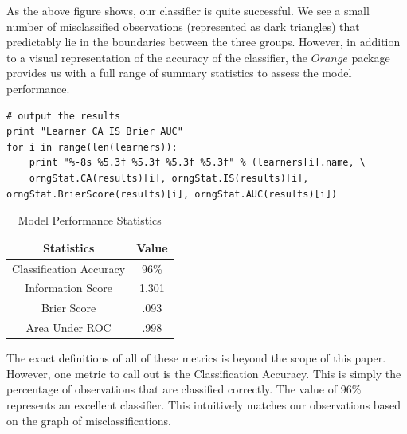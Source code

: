 \begin{flushleft}As the above figure shows, our classifier is quite successful. We see a small number of misclassified observations (represented as dark triangles) that predictably lie in the boundaries between the three groups. However, in addition to a visual representation of the accuracy of the classifier, the $Orange$ package provides us with a full range of summary statistics to assess the model performance. 
\end{flushleft}
\begin{lstlisting}[caption={Compute the Misclassified Observations},label=2nd,firstnumber=151]
# output the results
print "Learner CA IS Brier AUC"
for i in range(len(learners)):
    print "%-8s %5.3f %5.3f %5.3f %5.3f" % (learners[i].name, \
    orngStat.CA(results)[i], orngStat.IS(results)[i], orngStat.BrierScore(results)[i], orngStat.AUC(results)[i])
\end{lstlisting}

\begin{table}[H]
\caption{Model Performance Statistics}
\centering
\begin{tabular}{c c}
\hline\hline
Statistics & Value\\
\hline
Classification Accuracy & 96\% \\
Information Score & 1.301\\
Brier Score & .093\\
Area Under ROC &.998\\
\hline
\end{tabular}
\label{table:nonlin} 
\end{table}

\begin{flushleft}The exact definitions of all of these metrics is beyond the scope of this paper. However, one metric to call out is the Classification Accuracy. This is simply the percentage of observations that are classified correctly. The value of 96\% represents an excellent classifier. This intuitively matches our observations based on the graph of misclassifications.
\end{flushleft}





